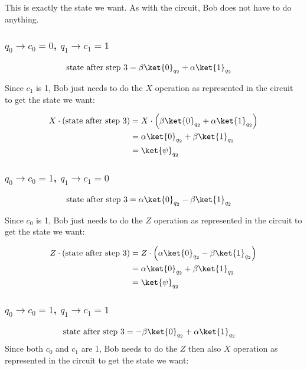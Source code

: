 \documentclass[10pt,a4paper]{article}
\newcommand{\<}{\langle}
\renewcommand{\>}{\rangle}
\newcommand{\prths}[1]{\left( #1 \right)}
\begin{document}
This is exactly the state we want. As with the circuit, Bob does not have to do anything.

\subsubsection{ $q_0 \rightarrow c_0 = 0$, $q_1 \rightarrow c_1 = 1$}
\begin{align*}
\textrm{state after step 3}
& =
\beta  \ket{0}_{q_2}
+\alpha \ket{1}_{q_2}
\end{align*}

Since $c_1$ is 1, Bob just needs to do the $X$ operation as represented in the circuit to get the
state we want:

\begin{align*}
X \cdot \prths {\textrm{state after step 3}}
& =
X \cdot \prths{
\beta  \ket{0}_{q_2}
+\alpha \ket{1}_{q_2}
}
\\ & =
\alpha \ket{0}_{q_2}
+\beta  \ket{1}_{q_2}
\\ & = \ket{\psi}_{q_2}
\end{align*}

\subsubsection{ $q_0 \rightarrow c_0 = 1$, $q_1 \rightarrow c_1 = 0$}
\begin{align*}
\textrm{state after step 3}
& =
\alpha \ket{0}_{q_2}
-\beta  \ket{1}_{q_2}
\end{align*}

Since $c_0$ is 1, Bob just needs to do the $Z$ operation as represented in the circuit to get the
state we want:

\begin{align*}
Z \cdot \prths {\textrm{state after step 3}}
& =
Z \cdot \prths{
\alpha \ket{0}_{q_2}
-\beta  \ket{1}_{q_2}
}
\\ & =
\alpha \ket{0}_{q_2}
+\beta  \ket{1}_{q_2}
\\ & = \ket{\psi}_{q_2}
\end{align*}

\subsubsection{ $q_0 \rightarrow c_0 = 1$, $q_1 \rightarrow c_1 = 1$}
\begin{align*}
\textrm{state after step 3}
& =
-\beta  \ket{0}_{q_2}
+\alpha \ket{1}_{q_2}
\end{align*}
Since both $c_0$ and $c_1$ are 1, Bob needs to do the $Z$ then also $X$ operation as represented in
the circuit to get the state we want:
\end{document}
